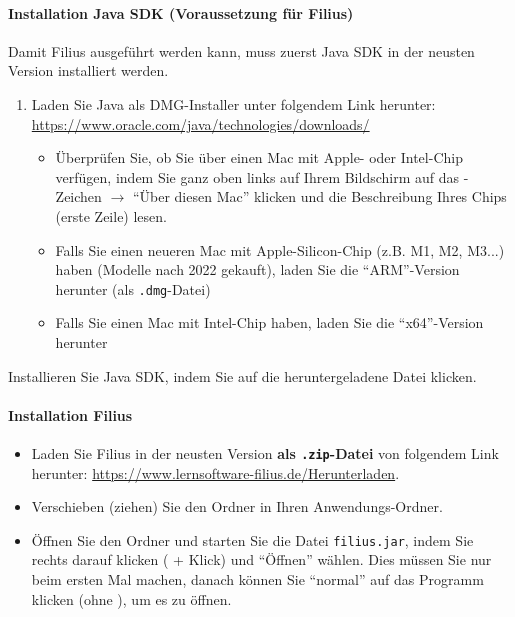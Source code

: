 \paragraph*{Installation Java SDK (Voraussetzung für Filius)}
Damit Filius ausgeführt werden kann, muss zuerst Java SDK in der neusten Version installiert werden.
\begin{enumerate}
	\item Laden Sie Java als DMG-Installer unter folgendem Link herunter: \url{https://www.oracle.com/java/technologies/downloads/}
	      \begin{itemize}
		      \item Überprüfen Sie, ob Sie über einen Mac mit Apple- oder Intel-Chip verfügen, indem Sie ganz oben links auf Ihrem Bildschirm auf das \faApple{}-Zeichen $\rightarrow$ ``Über diesen Mac'' klicken und die Beschreibung Ihres Chips (erste Zeile) lesen.
		      \item Falls Sie einen neueren Mac mit Apple-Silicon-Chip (z.B. M1, M2, M3...) haben (Modelle nach 2022 gekauft), laden Sie die ``ARM''-Version herunter (als \texttt{.dmg}-Datei)
		      \item Falls Sie einen Mac mit Intel-Chip haben, laden Sie die ``x64''-Version herunter
	      \end{itemize}
\end{enumerate}

Installieren Sie Java SDK, indem Sie auf die heruntergeladene Datei klicken.

\paragraph*{Installation Filius}

\begin{itemize}
	\item Laden Sie Filius in der neusten Version \textbf{als \texttt{.zip}-Datei} von folgendem Link herunter: \url{https://www.lernsoftware-filius.de/Herunterladen}.
	\item Verschieben (ziehen) Sie den Ordner in Ihren Anwendungs-Ordner.
	\item Öffnen Sie den Ordner und starten Sie die Datei \texttt{filius.jar}, indem Sie rechts darauf klicken (\keys{\Alt} + Klick) und ``Öffnen'' wählen. Dies müssen Sie nur beim ersten Mal machen, danach können Sie ``normal'' auf das Programm klicken (ohne \keys{\Alt}), um es zu öffnen.
\end{itemize}


\newpage
\printglossary
